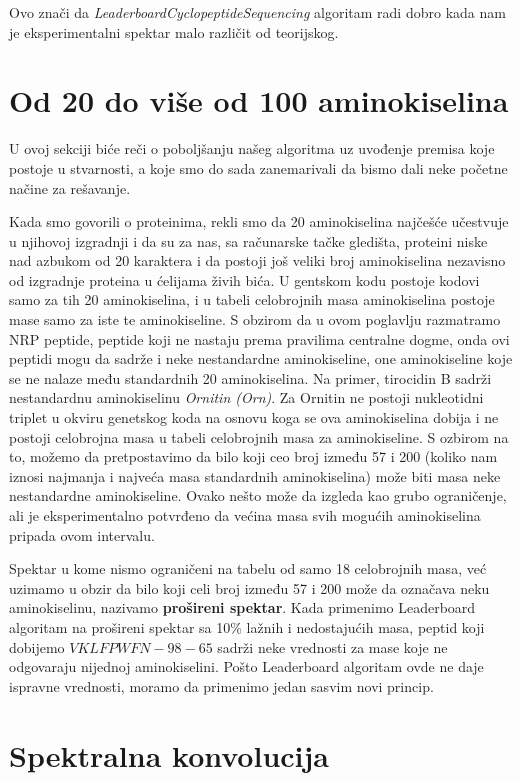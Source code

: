 Ovo znači da \textit{LeaderboardCyclopeptideSequencing} algoritam radi dobro kada nam je eksperimentalni spektar malo različit od teorijskog.

\section{Od 20 do više od 100 aminokiselina} \label{viseAmino}

U ovoj sekciji biće reči o poboljšanju našeg algoritma uz uvođenje premisa koje postoje u stvarnosti, a koje smo do sada zanemarivali da bismo dali neke početne načine za rešavanje.

Kada smo govorili o proteinima, rekli smo da 20 aminokiselina najčešće učestvuje u njihovoj izgradnji i da su za nas, sa računarske tačke gledišta, proteini niske nad azbukom od 20 karaktera i da postoji još veliki broj aminokiselina nezavisno od izgradnje proteina u ćelijama živih bića. U gentskom kodu postoje kodovi samo za tih 20 aminokiselina, i u tabeli celobrojnih masa aminokiselina postoje mase samo za iste te aminokiseline. S obzirom da u ovom poglavlju razmatramo NRP peptide, peptide koji ne nastaju prema pravilima centralne dogme,  onda ovi peptidi mogu da sadrže i neke nestandardne aminokiseline, one aminokiseline koje se ne nalaze među standardnih 20 aminokiselina. Na primer, tirocidin B sadrži nestandardnu aminokiselinu \textit{Ornitin (Orn)}. Za Ornitin ne postoji nukleotidni triplet u okviru genetskog koda na osnovu koga se ova aminokiselina dobija i ne postoji celobrojna masa u tabeli celobrojnih masa za aminokiseline. S ozbirom na to, možemo da pretpostavimo da bilo koji ceo broj između 57 i 200 (koliko nam iznosi najmanja i najveća masa standardnih aminokiselina) može biti masa neke nestandardne aminokiseline. Ovako nešto može da izgleda kao grubo ograničenje, ali je eksperimentalno potvrđeno da većina masa svih mogućih aminokiselina pripada ovom intervalu.

Spektar u kome nismo ograničeni na tabelu od samo 18 celobrojnih masa, već uzimamo u obzir da bilo koji celi broj između 57 i 200 može da označava neku aminokiselinu, nazivamo \textbf{prošireni spektar}. Kada primenimo Leaderboard algoritam na prošireni spektar sa 10\% lažnih i nedostajućih masa, peptid koji dobijemo $  VKLFPWFN-98-65 $ sadrži neke vrednosti za mase koje ne odgovaraju nijednoj aminokiselini. Pošto Leaderboard algoritam ovde ne daje ispravne vrednosti, moramo da primenimo jedan sasvim novi princip.

\section{Spektralna konvolucija} \label{konvolucija}

